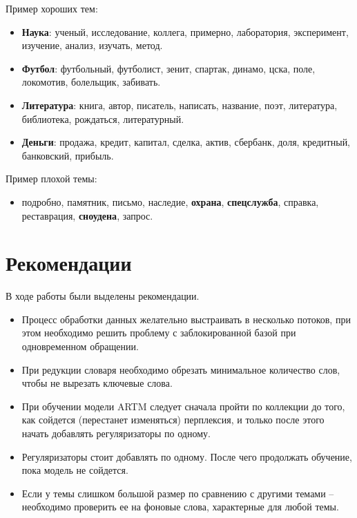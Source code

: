 Пример хороших тем:
\begin{itemize}
    \item\textbf{Наука}: ученый, исследование, коллега, примерно, лаборатория, эксперимент, изучение, анализ, изучать, метод.
    \item\textbf{Футбол}: футбольный, футболист, зенит, спартак, динамо, цска, поле, локомотив, болельщик, забивать.
    \item\textbf{Литература}: книга, автор, писатель, написать, название, поэт, литература, библиотека, рождаться, литературный.
    \item\textbf{Деньги}: продажа, кредит, капитал, сделка, актив, сбербанк, доля, кредитный, банковский, прибыль.
\end{itemize}

Пример плохой темы:
\begin{itemize}
    \item подробно, памятник, письмо, наследие, \textbf{охрана}, \textbf{спецслужба}, справка, реставрация, \textbf{сноудена}, запрос.
\end{itemize}


%
\section{Рекомендации}

В ходе работы были выделены рекомендации.


\begin{itemize}
    \item Процесс обработки данных желательно выстраивать в несколько потоков, при этом необходимо решить проблему с заблокированной базой при одновременном обращении.
    \item При редукции словаря необходимо обрезать минимальное количество слов, чтобы не вырезать ключевые слова.
    \item При обучении модели ARTM следует сначала пройти по коллекции до того,  как сойдется (перестанет изменяться) перплексия, и только после этого начать добавлять регуляризаторы по одному.
    \item Регуляризаторы стоит добавлять по одному. После чего продолжать обучение, пока модель не сойдется.
    \item Если у темы слишком большой размер по сравнению с другими темами – необходимо проверить ее на фоновые слова, характерные для любой темы.
\end{itemize}